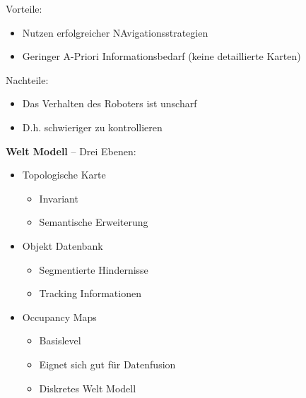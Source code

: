 Vorteile:
\begin{itemize}
	\item Nutzen erfolgreicher NAvigationsstrategien
	\item Geringer A-Priori Informationsbedarf (keine detaillierte Karten)
\end{itemize}
Nachteile:
\begin{itemize}
	\item Das Verhalten des Roboters ist unscharf
	\item D.h. schwieriger zu kontrollieren
\end{itemize}
\noindent
\textbf{Welt Modell} -- Drei Ebenen:
\begin{itemize}
	\item Topologische Karte
	\begin{itemize}
		\item Invariant
		\item Semantische Erweiterung
	\end{itemize}
	\item Objekt Datenbank
	\begin{itemize}
		\item Segmentierte Hindernisse
		\item Tracking Informationen
	\end{itemize}
	\item Occupancy Maps
	\begin{itemize}
		\item Basislevel
		\item Eignet sich gut für Datenfusion
		\item Diskretes Welt Modell
	\end{itemize}
\end{itemize}

